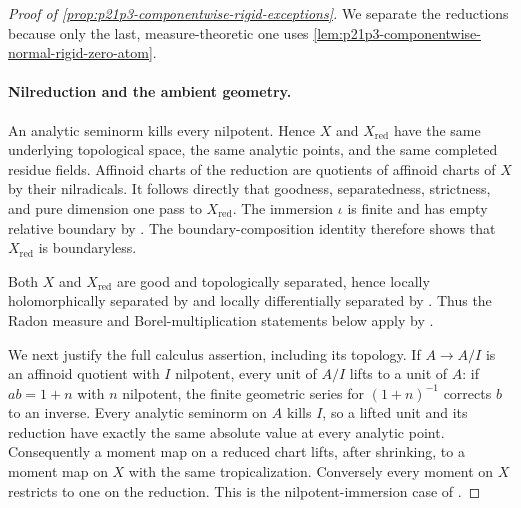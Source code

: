 
\begin{proof}[Proof of
\cref{prop:p21p3-componentwise-rigid-exceptions}]
We separate the reductions because only the last, measure-theoretic one uses
\cref{lem:p21p3-componentwise-normal-rigid-zero-atom}.

\paragraph{Nilreduction and the ambient geometry.}
An analytic seminorm kills every nilpotent.  Hence $X$ and
$X_{\mathrm{red}}$ have the same underlying topological space, the same
analytic points, and the same completed residue fields.  Affinoid charts of
the reduction are quotients of affinoid charts of $X$ by their nilradicals.
It follows directly that goodness, separatedness, strictness, and pure
dimension one pass to $X_{\mathrm{red}}$.  The immersion $\iota$ is finite
and has empty relative boundary by \cite[\S11.4.4]{CLD25}.  The
boundary-composition identity \cite[(11.4.1.3)]{CLD25} therefore shows that
$X_{\mathrm{red}}$ is boundaryless.

Both $X$ and $X_{\mathrm{red}}$ are good and topologically separated, hence
locally holomorphically separated by \cite[\S15.2.2]{CLD25} and locally
differentially separated by \cite[Corollary~15.2.4]{CLD25}.  Thus the Radon
measure and Borel-multiplication statements below apply by
\cite[Lemma~7.2.4, Proposition~7.2.8, and Example~7.2.12]{CLD25}.

We next justify the full calculus assertion, including its topology.  If
$A\to A/I$ is an affinoid quotient with $I$ nilpotent, every unit of $A/I$
lifts to a unit of $A$: if $ab=1+n$ with $n$ nilpotent, the finite geometric
series for $(1+n)^{-1}$ corrects $b$ to an inverse.  Every analytic seminorm
on $A$ kills $I$, so a lifted unit and its reduction have exactly the same
absolute value at every analytic point.  Consequently a moment map on a
reduced chart lifts, after shrinking, to a moment map on $X$ with the same
tropicalization.  Conversely every moment on $X$ restricts to one on the
reduction.  This is the nilpotent-immersion case of
\cite[Proposition~15.1.3(b) and the following form variant]{CLD25}.


\end{proof}
